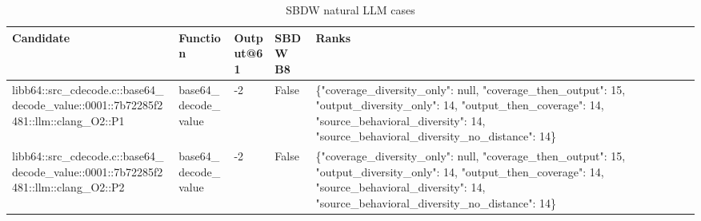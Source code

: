 \begin{table}[t]
\centering
\small
\begin{tabular}{lllll}
\toprule
Candidate & Function & Output@61 & SBDW B8 & Ranks \\
\midrule
libb64::src\_cdecode.c::base64\_decode\_value::0001::7b72285f2481::llm::clang\_O2::P1 & base64\_decode\_value & -2 & False & \{"coverage\_diversity\_only": null, "coverage\_then\_output": 15, "output\_diversity\_only": 14, "output\_then\_coverage": 14, "source\_behavioral\_diversity": 14, "source\_behavioral\_diversity\_no\_distance": 14\} \\
libb64::src\_cdecode.c::base64\_decode\_value::0001::7b72285f2481::llm::clang\_O2::P2 & base64\_decode\_value & -2 & False & \{"coverage\_diversity\_only": null, "coverage\_then\_output": 15, "output\_diversity\_only": 14, "output\_then\_coverage": 14, "source\_behavioral\_diversity": 14, "source\_behavioral\_diversity\_no\_distance": 14\} \\
\bottomrule
\end{tabular}
\caption{SBDW natural LLM cases}
\end{table}
